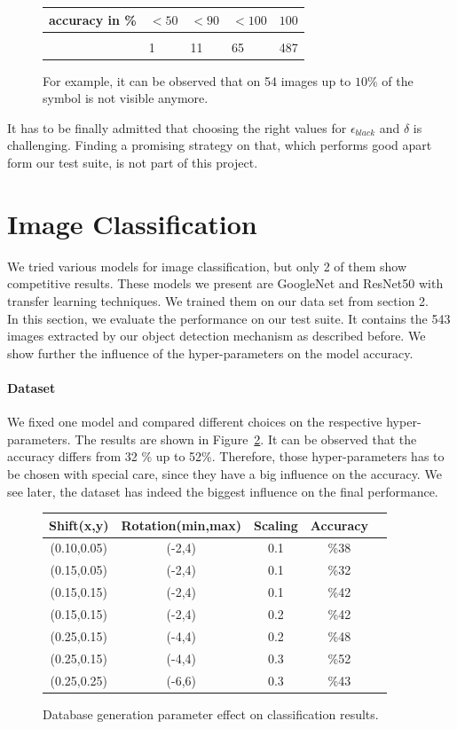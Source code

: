 \documentclass[twocolumn]{article}
\begin{document}
\begin{figure}
\begin{tabular}{l|l l l l}
 accuracy in \%  & $<50$   & $ < 90 $ &  $ < 100$ &  $100$ \\
 \hline \\
 & 1 & 11 & 65 & 487 
\end{tabular}
\caption{For example, it can be observed that on 54 images up to $10 \%$ of the symbol is not visible anymore.}
\label{quality}
\end{figure}


It has to be finally admitted that choosing the right values for $\epsilon_{black}$ and $\delta$ is challenging. Finding a promising strategy on that, which performs good apart form our test suite, is not part of this project.  

\section{Image Classification}
We tried various models for image classification, but only 2 of them show competitive results. These models we present are GoogleNet and ResNet50 with transfer learning techniques. We trained them on our data set from section 2.\\
In this section, we evaluate the performance on our test suite. It contains the 543 images extracted by our object detection mechanism as described before. We show further the influence of the hyper-parameters on the model accuracy.

\paragraph{Dataset}
We fixed one model and compared different choices on the respective hyper-parameters. The results are shown in Figure~\ref{database_param}. It can be observed that the accuracy differs from 32 \% up to 52\%. Therefore, those hyper-parameters has to be chosen with special care, since they have a big influence on the accuracy. We see later, the dataset has indeed the biggest influence on the final performance. 

\begin{figure}
 \begin{center}
\begin{tabular}{|c|c|c|c|c|}
 \hline
 Shift(x,y)&Rotation(min,max)&Scaling&Accuracy\\
 \hline
 (0.10,0.05) & (-2,4) & 0.1 &\%38 \\
 \hline
 (0.15,0.05) & (-2,4) & 0.1 &\%32 \\
 \hline
 (0.15,0.15) & (-2,4) & 0.1&\%42 \\
  \hline
 (0.15,0.15) & (-2,4) & 0.2&\%42 \\
 \hline
 (0.25,0.15) & (-4,4) & 0.2&\%48 \\
 \hline
  (0.25,0.15) & (-4,4) & 0.3&\%52 \\
 \hline
 (0.25,0.25) & (-6,6) & 0.3&\%43 \\
 \hline
\end{tabular}
\caption{Database generation parameter effect on classification results.}
\label{database_param}
\end{center}
\end{figure}
\end{document}

